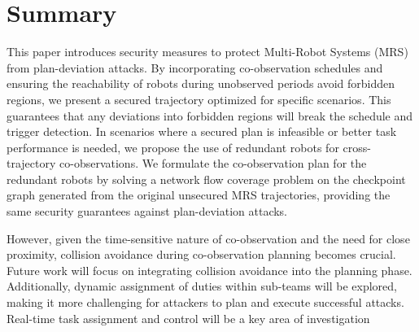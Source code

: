 \documentclass[10pt,twocolumn,twoside]{IEEEtran}
\begin{document}
\section{Summary}\label{sec:summary}
This paper introduces security measures to protect Multi-Robot Systems (MRS) from plan-deviation attacks. By incorporating co-observation schedules and ensuring the reachability of robots during unobserved periods avoid forbidden regions, we present a secured trajectory optimized for specific scenarios. This guarantees that any deviations into forbidden regions will break the schedule and trigger detection. In scenarios where a secured plan is infeasible or better task performance is needed, we propose the use of redundant robots for cross-trajectory co-observations. We formulate the co-observation plan for the redundant robots by solving a network flow coverage problem on the checkpoint graph generated from the original unsecured MRS trajectories, providing the same security guarantees against plan-deviation attacks.

However, given the time-sensitive nature of co-observation and the need for close proximity, collision avoidance during co-observation planning becomes crucial. Future work will focus on integrating collision avoidance into the planning phase. Additionally, dynamic assignment of duties within sub-teams will be explored, making it more challenging for attackers to plan and execute successful attacks. Real-time task assignment and control will be a key area of investigation


\end{document}
